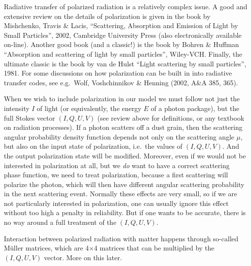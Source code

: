 \documentclass{report}
\begin{document}
Radiative transfer of polarized radiation is a relatively complex issue. A
good and extensive review on the details of polarization is given in the
book by Mishchenko, Travis \& Lacis, ``Scattering, Absorption and Emission
of Light by Small Particles'', 2002, Cambridge University Press (also
electronically available on-line). Another good book (and a classic!)  is
the book by Bohren \& Huffman ``Absorption and scattering of light by small
particles'', Wiley-VCH. Finally, the ultimate classic is the book by van de
Hulst ``Light scattering by small particles'', 1981. For some discussions on
how polarization can be built in into radiative transfer codes, see e.g.\
Wolf, Voshchinnikov \& Henning (2002, A\&A 385, 365).
 
When we wish to include polarization in our model we must follow not just
the intensity $I$ of light (or equivalently, the energy $E$ of a photon
package), but the full Stokes vector $(I,Q,U,V)$ (see review above for
definitions, or any textbook on radiation processes). If a photon scatters
off a dust grain, then the scattering angular probability density function
depends not only on the scattering angle $\mu$, but also on the input state
of polarization, i.e.\ the values of $(I,Q,U,V)$. And the output
polarization state will be modified. Moreover, even if we would not be
interested in polarization at all, but we {\em do} want to have a correct
scattering phase function, we need to treat polarization, because a first
scattering will polarize the photon, which will then have different angular
scattering probability in the next scattering event. Normally these effects
are very small, so if we are not particularly interested in polarization,
one can usually ignore this effect without too high a penalty in
reliability. But if one wants to be accurate, there is no way around a full
treatment of the $(I,Q,U,V)$.

Interaction between polarized radiation with matter happens through
so-called M\"uller matrices, which are 4$\times$4 matrices that can be
multiplied by the $(I,Q,U,V)$ vector. More on this later.
\end{document}
